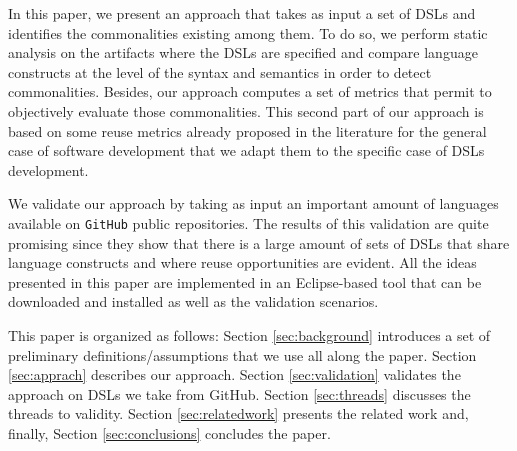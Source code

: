 In this paper, we present an approach that takes as input a set of DSLs and identifies the commonalities existing among them. To do so, we perform static analysis on the artifacts where the DSLs are specified and compare language constructs at the level of the syntax and semantics in order to detect commonalities. Besides, our approach computes a set of metrics that permit to objectively evaluate those commonalities. This second part of our approach is based on some reuse metrics already proposed in the literature for the general case of software development \cite{Berger:2014,Berger:126283} that we adapt them to the specific case of DSLs development.

We validate our approach by taking as input an important amount of languages available on \texttt{GitHub} public repositories. The results of this validation are quite promising since they show that there is a large amount of sets of DSLs that share language constructs and where reuse opportunities are evident. All the ideas presented in this paper are implemented in an Eclipse-based tool that can be downloaded and installed as well as the validation scenarios. 


This paper is organized as follows: Section \ref{sec:background} introduces a set of preliminary definitions/assumptions that we use all along the paper. Section \ref{sec:apprach} describes our approach. Section \ref{sec:validation} validates the approach on DSLs we take from GitHub. Section \ref{sec:threads} discusses the threads to validity. Section \ref{sec:relatedwork} presents the related work and, finally, Section \ref{sec:conclusions} concludes the paper. 

